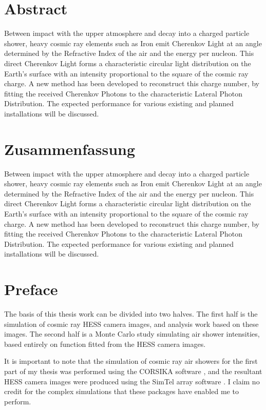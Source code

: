\documentclass[11pt]{article}
\begin{document}
\section*{Abstract}
Between impact with the upper atmosphere and decay into a charged particle shower, heavy cosmic ray elements such as Iron emit Cherenkov Light at an angle determined by the Refractive Index of the air and the energy per nucleon. This direct Cherenkov Light forms a characteristic circular light distribution on the Earth's surface with an intensity proportional to the square of the cosmic ray charge. A new method has been developed to reconstruct this charge number, by fitting the received Cherenkov Photons to the characteristic Lateral Photon Distribution. The expected performance for various existing and planned installations will be discussed.

\section*{Zusammenfassung}
Between impact with the upper atmosphere and decay into a charged particle shower, heavy cosmic ray elements such as Iron emit Cherenkov Light at an angle determined by the Refractive Index of the air and the energy per nucleon. This direct Cherenkov Light forms a characteristic circular light distribution on the Earth's surface with an intensity proportional to the square of the cosmic ray charge. A new method has been developed to reconstruct this charge number, by fitting the received Cherenkov Photons to the characteristic Lateral Photon Distribution. The expected performance for various existing and planned installations will be discussed.
\newpage
\tableofcontents
\newpage

\section{Preface}
The basis of this thesis work can be divided into two halves. The first half is the simulation of cosmic ray HESS camera images, and analysis work based on these images. The second half is a Monte Carlo study simulating air shower intensities, based entirely on function fitted from the HESS camera images. 

It is important to note that the simulation of cosmic ray air showers for the first part of my thesis was performed using the CORSIKA software \cite{Heck98}, and the resultant HESS camera images were produced using the Sim\textunderscore Tel array software \cite{Bernlohr08}. I claim no credit for the complex simulations that these packages have enabled me to perform. 
\end{document}
